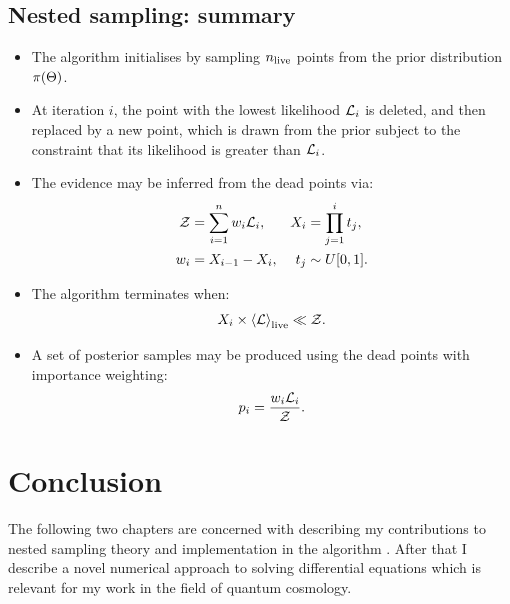 \subsection{Nested sampling: summary}
\label{sec:bay:comp_space}
\begin{itemize}
  \item The algorithm initialises by sampling \(n_{\mathrm{live}}\) points from the prior distribution \(\pi(\Theta)\). 
  \item At iteration \(i\), the point with the lowest likelihood \(\mathcal{L}_i\) is deleted, and then replaced by a new point, which is drawn from the prior subject to the constraint that its likelihood is greater than \(\mathcal{L}_i\). 
  \item The evidence may be inferred from the dead points via:
    \begin{align}
      \mathcal{Z} &= \sum_{i=1}^n w_i \mathcal{L}_i, &
      X_i &= \prod_{j=1}^{i} t_j, \nonumber \\
      w_i &= X_{i-1}-X_{i},  & 
      t_j &\sim U[0,1].\nonumber 
    \end{align}
  \item The algorithm terminates when:
    \begin{equation}
      X_i \times {\left\langle{\mathcal{L}}\right\rangle}_{\mathrm{live}} \ll \mathcal{Z}.
    \end{equation}
  \item A set of posterior samples may be produced using the dead points with importance weighting:
    \begin{equation}
      p_i = \frac{w_i\mathcal{L}_i}{\mathcal{Z}}.\nonumber
    \end{equation}

\end{itemize}


\section{Conclusion}
The following two chapters are concerned with describing my contributions to nested sampling theory and implementation in the algorithm \PolyChord{}. After that I describe a novel numerical approach to solving differential equations which is relevant for my work in the field of quantum cosmology.

\begin{subappendices}
  
\end{subappendices}


